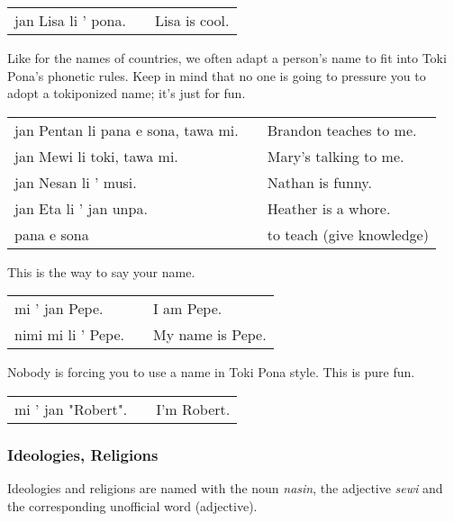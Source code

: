 \begin{supertabular}{p{5,5cm}|ll}
    jan Lisa li ' pona. &  & Lisa is cool. \\
\end{supertabular}

Like for the names of countries, we often adapt a person's name to fit into Toki Pona's phonetic rules.
Keep in mind that no one is going to pressure you to adopt a tokiponized name; it's just for fun.

\begin{supertabular}{p{5,5cm}|ll}
    jan Pentan li pana e sona, tawa mi. &  & Brandon teaches to me.    \\
    jan Mewi li toki, tawa mi.          &  & Mary's talking to me.     \\
    jan Nesan li ' musi.                &  & Nathan is funny.          \\
    jan Eta li ' jan unpa.              &  & Heather is a whore.       \\
    pana e sona                         &  & to teach (give knowledge) \\
\end{supertabular}

This is the way to say your name.

\begin{supertabular}{p{5,5cm}|ll}
    mi ' jan Pepe.     &  & I am Pepe.       \\
    nimi mi li ' Pepe. &  & My name is Pepe. \\
\end{supertabular}

Nobody is forcing you to use a name in Toki Pona style.
This is pure fun.

\begin{supertabular}{p{5,5cm}|ll}
    mi ' jan "Robert". &  & I'm Robert. \\
\end{supertabular}

%
\subsubsection*{Ideologies, Religions}
%

Ideologies and religions are named with the noun \textit{nasin}, the adjective \textit{sewi} and the corresponding unofficial word (adjective).

